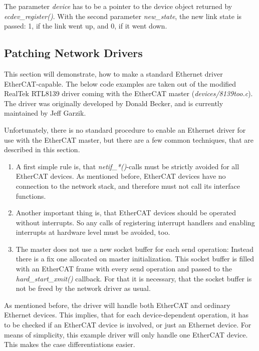 \documentclass[a4paper,12pt,BCOR6mm,bibtotoc,idxtotoc]{scrbook}
\begin{document}
The parameter \textit{device} has to be a pointer to the device object
returned by \textit{ecdev\_\-register()}. With the second parameter
\textit{new\_state}, the new link state is passed: 1, if the link went
up, and 0, if it went down.


\subsection{Patching Network Drivers}
\label{sec:patching}

This section will demonstrate, how to make a standard Ethernet driver
EtherCAT-capable. The below code examples are taken out of the
modified RealTek RTL8139 driver coming with the EtherCAT master
(\textit{devices/8139too.c}). The driver was originally developed by
Donald Becker, and is currently maintained by Jeff Garzik.

Unfortunately, there is no standard procedure to enable an Ethernet
driver for use with the EtherCAT master, but there are a few common
techniques, that are described in this section.

\begin{enumerate}
\item A first simple rule is, that \textit{netif\_*()}-calls must be
  strictly avoided for all EtherCAT devices. As mentioned before,
  EtherCAT devices have no connection to the network stack, and
  therefore must not call its interface functions.
\item Another important thing is, that EtherCAT devices should be
  operated without interrupts. So any calls of registering interrupt
  handlers and enabling interrupts at hardware level must be avoided,
  too.
\item The master does not use a new socket buffer for each send
  operation: Instead there is a fix one allocated on master
  initialization. This socket buffer is filled with an EtherCAT frame
  with every send operation and passed to the
  \textit{hard\_start\_xmit()} callback. For that it is necessary,
  that the socket buffer is not be freed by the network driver as
  usual.
\end{enumerate}

As mentioned before, the driver will handle both EtherCAT and ordinary
Ethernet devices. This implies, that for each device-dependent
operation, it has to be checked if an EtherCAT device is involved, or
just an Ethernet device. For means of simplicity, this example driver
will only handle one EtherCAT device. This makes the case
differentiations easier.
\end{document}
